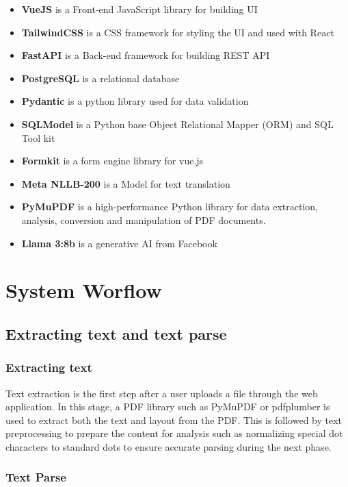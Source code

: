 \documentclass[12pt,oneside,openright,a4paper]{cpe-english-project}
\begin{document}
\begin{itemize}
\item  \textbf{VueJS} is a Front-end JavaScript library for building UI
\item \textbf{TailwindCSS} is a CSS framework for styling the UI and used with React
\item \textbf{FastAPI} is a Back-end framework for building REST API
\item \textbf{PostgreSQL}  is a relational database
\item \textbf{Pydantic}  is a python library used for data validation 
\item \textbf{SQLModel} is a Python base Object Relational Mapper (ORM) and SQL Tool kit
\item \textbf{Formkit} is a form engine library for vue.js
\item \textbf{Meta NLLB-200} is a Model for text translation
\item \textbf{PyMuPDF}  is a high-performance Python library for data extraction, analysis, conversion and manipulation of PDF documents.
\item \textbf{Llama 3:8b} is a generative AI from Facebook
\end{itemize}


\section{System Worflow}

\subsection{Extracting text and text parse}

\subsubsection{Extracting text}

Text extraction is the first step after a user uploads a file through the web application. In this stage, a PDF library such as PyMuPDF or pdfplumber is used to extract both the text and layout from the PDF. This is followed by text preprocessing to prepare the content for analysis such as normalizing special dot characters to standard dots to ensure accurate parsing during the next phase.

\subsubsection{Text Parse}
\end{document}
